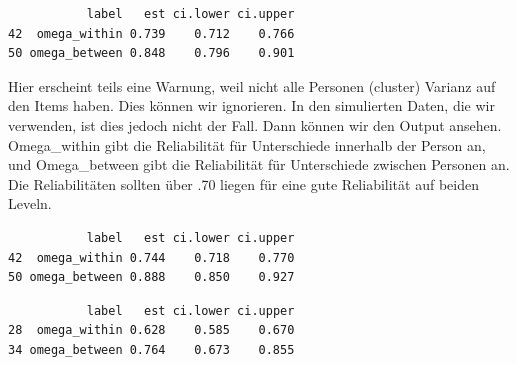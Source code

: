 \documentclass[
  letterpaper,
  DIV=11,
  numbers=noendperiod]{scrreprt}
\newenvironment{Shaded}{\begin{snugshade}}{\end{snugshade}}
\newcommand{\AttributeTok}[1]{\textcolor[rgb]{0.40,0.45,0.13}{#1}}
\newcommand{\FunctionTok}[1]{\textcolor[rgb]{0.28,0.35,0.67}{#1}}
\newcommand{\NormalTok}[1]{\textcolor[rgb]{0.00,0.23,0.31}{#1}}
\newcommand{\OtherTok}[1]{\textcolor[rgb]{0.00,0.23,0.31}{#1}}
\newcommand{\SpecialCharTok}[1]{\textcolor[rgb]{0.37,0.37,0.37}{#1}}
\newcommand{\StringTok}[1]{\textcolor[rgb]{0.13,0.47,0.30}{#1}}
\begin{document}
\begin{verbatim}
           label   est ci.lower ci.upper
42  omega_within 0.739    0.712    0.766
50 omega_between 0.848    0.796    0.901
\end{verbatim}

Hier erscheint teils eine Warnung, weil nicht alle Personen (cluster)
Varianz auf den Items haben. Dies können wir ignorieren. In den
simulierten Daten, die wir verwenden, ist dies jedoch nicht der Fall.
Dann können wir den Output ansehen. Omega\_within gibt die Reliabilität
für Unterschiede innerhalb der Person an, und Omega\_between gibt die
Reliabilität für Unterschiede zwischen Personen an. Die Reliabilitäten
sollten über .70 liegen für eine gute Reliabilität auf beiden Leveln.

\begin{Shaded}
\end{Shaded}

\begin{verbatim}
           label   est ci.lower ci.upper
42  omega_within 0.744    0.718    0.770
50 omega_between 0.888    0.850    0.927
\end{verbatim}

\begin{Shaded}
\end{Shaded}

\begin{verbatim}
           label   est ci.lower ci.upper
28  omega_within 0.628    0.585    0.670
34 omega_between 0.764    0.673    0.855
\end{verbatim}
\end{document}
